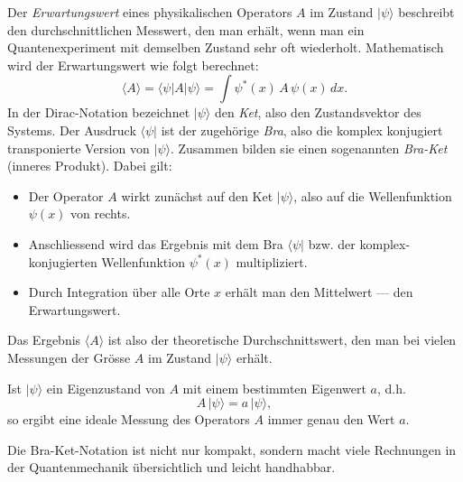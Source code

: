 		Der \emph{Erwartungswert} eines physikalischen Operators $A$ im Zustand $|\psi\rangle$ beschreibt den durchschnittlichen Messwert, den man erhält, wenn man ein Quantenexperiment mit demselben Zustand sehr oft wiederholt.
		Mathematisch wird der Erwartungswert wie folgt berechnet:
		\begin{equation}
			\langle A \rangle = \langle \psi | A | \psi \rangle = \int \psi^*(x)\,A\,\psi(x)\,dx.
		\end{equation}
		In der Dirac-Notation bezeichnet $|\psi\rangle$ den \emph{Ket}, also den Zustandsvektor des Systems.
		Der Ausdruck $\langle \psi |$ ist der zugehörige \emph{Bra}, also die komplex konjugiert transponierte Version von $|\psi\rangle$.
		Zusammen bilden sie einen sogenannten \emph{Bra-Ket} (inneres Produkt).
		Dabei gilt:
		\begin{itemize}
			\item Der Operator $A$ wirkt zunächst auf den Ket $|\psi\rangle$, also auf die Wellenfunktion $\psi(x)$ von rechts.
			\item Anschliessend wird das Ergebnis mit dem Bra $\langle \psi|$ bzw. der komplex-konjugierten Wellenfunktion $\psi^*(x)$ multipliziert.
			\item Durch Integration über alle Orte $x$ erhält man den Mittelwert --- den Erwartungswert.
		\end{itemize}
		Das Ergebnis $\langle A \rangle$ ist also der theoretische Durchschnittswert, den man bei vielen Messungen der Grösse $A$ im Zustand $|\psi\rangle$ erhält.

		Ist $|\psi\rangle$ ein Eigenzustand von $A$ mit einem bestimmten Eigenwert $a$, d.h.
		\begin{equation}
		A\,|\psi\rangle = a\,|\psi\rangle,
		\end{equation}
		so ergibt eine ideale Messung des Operators $A$ immer genau den Wert $a$.

		Die Bra-Ket-Notation ist nicht nur kompakt, sondern macht viele Rechnungen in der Quantenmechanik übersichtlich und leicht handhabbar.


